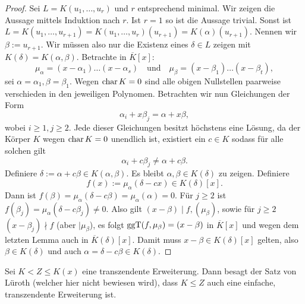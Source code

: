 \begin{proof}
    Sei $L = K(u_1, \hdots, u_r)$ und $r$ entsprechend minimal. Wir zeigen die Aussage mittels Induktion nach $r$. Ist $r = 1$ so ist die Aussage trivial. Sonst ist $L = K(u_1, \hdots, u_{r+1}) = K(u_1, \hdots, u_r)(u_{r+1}) = K(\alpha)(u_{r+1})$. Nennen wir $\beta := u_{r+1}$. Wir müssen also nur die Existenz eines $\delta \in L$ zeigen mit $K(\delta) = K(\alpha, \beta)$. Betrachte in $\overline{K}[x]$:
    $$ \mu_\alpha = (x - \alpha_1) \hdots (x - \alpha_s) \quad \mathrm{und}\quad
     \mu_\beta = (x - \beta_1) \hdots (x - \beta_t), $$ \obda sei $\alpha = \alpha_1, \beta = \beta_1$. Wegen $\operatorname{char} K = 0$ sind alle obigen Nullstellen paarweise verschieden in den jeweiligen Polynomen. Betrachten wir nun Gleichungen der Form
    $$ \alpha_i + x \beta_j = \alpha + x \beta, $$
    wobei $i \geq 1, j \geq 2$. Jede dieser Gleichungen besitzt höchstens eine Lösung, da der Körper $K$ wegen $\operatorname{char} K=0$ unendlich ist, existiert ein $c \in K$ sodass für alle solchen gilt $$ \alpha_i + c \beta_j \neq \alpha + c \beta. $$
    Definiere $\delta := \alpha + c \beta \in K(\alpha, \beta)$. Es bleibt $\alpha, \beta \in K(\delta)$ zu zeigen. Definiere
    $$ f(x) := \mu_\alpha (\delta - cx) \in K(\delta)[x]. $$
    Dann ist $f(\beta) = \mu_\alpha(\delta - c \beta) = \mu_\alpha(\alpha) = 0$. Für $j \geq 2$ ist $f(\beta_j) = \mu_\alpha(\delta - c \beta_j) \neq 0$. Also gilt $(x - \beta) \mid f, (\mu_\beta)$, sowie für $j \geq 2$ $(x-\beta_j) \nmid f$ (aber $\mid \mu_\beta$), es folgt $\operatorname{ggT}(f,\mu_\beta)=(x-\beta)$ in $\overline{K}[x]$ und wegen dem letzten Lemma auch in $\overline{K}(\delta)[x]$. Damit muss $x-\beta\in K(\delta)[x]$ gelten, also $\beta\in K(\delta)$ und auch $\alpha=\delta-c\beta\in K(\delta)$.
\end{proof}

\begin{remark}
    Sei $K < Z \leq K(x)$ eine transzendente Erweiterung. Dann besagt der Satz von Lüroth (welcher hier nicht bewiesen wird), dass $K \leq Z$ auch eine einfache, transzendente Erweiterung ist.
\end{remark}